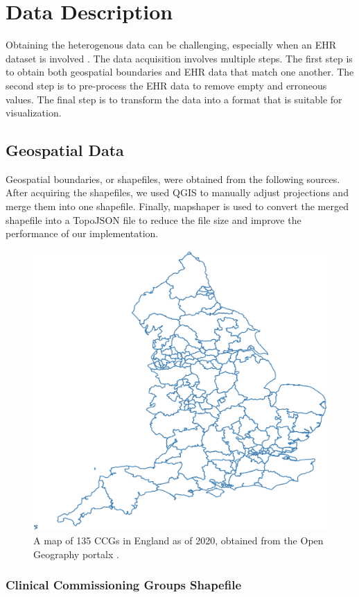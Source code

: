 \section{Data Description}

Obtaining the heterogenous data can be challenging, especially when an EHR dataset is involved \cite{wang2021EHRa}. The data acquisition involves multiple steps. The first step is to obtain both geospatial boundaries and EHR data that match one another. The second step is to pre-process the EHR data to remove empty and erroneous values. The final step is to transform the data into a format that is suitable for visualization.

\subsection{Geospatial Data}

Geospatial boundaries, or shapefiles, were obtained from the following sources. After acquiring the shapefiles, we used QGIS \cite{qgisWelcome} to manually adjust projections and merge them into one shapefile. Finally, mapshaper \cite{blochMapshaper} is used to convert the merged shapefile into a TopoJSON \cite{TopoJSON} file to reduce the file size and improve the performance of our implementation.

{
\begin{figure}[tb!]
    \centering
    \includegraphics[width=0.6\columnwidth]{figure/ccg.png}
    \caption{A map of 135 CCGs in England as of 2020, obtained from the Open Geography portalx \cite{opengeographyportalxOpen}.}
    \label{fig:ccg}
\end{figure}
}

\subsubsection{Clinical Commissioning Groups Shapefile}

